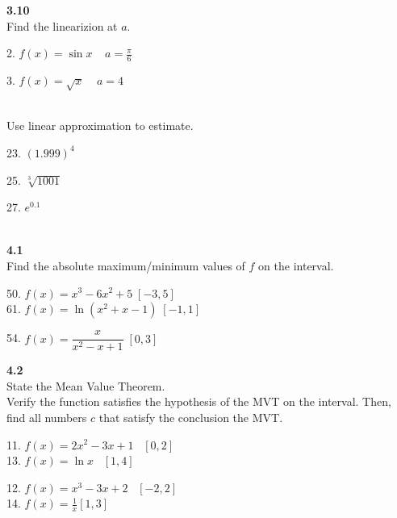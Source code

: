 \documentclass{letter}
\begin{document}
\begin{itemize}
		\textbf{3.10}\\
		
		Find the linearizion at $a$.\\
		\begin{minipage}[t]{0.5\textwidth}
			2. $f(x) = \sin x \;\;\;\; a = \frac{\pi}{6}$
		\end{minipage}
		\begin{minipage}[t]{0.5\textwidth}
			3. $f(x) = \sqrt x \;\;\;\; a = 4$
		\end{minipage}\\
		
		Use linear approximation to estimate.\\
		\begin{minipage}[t]{0.3\textwidth}
			23. $(1.999)^4$
		\end{minipage}
		\begin{minipage}[t]{0.3\textwidth}
			25. $\sqrt[3]{1001}$
		\end{minipage}
		\begin{minipage}[t]{0.3\textwidth}
			27. $e^{0.1}$\\
		\end{minipage}\\
		
		\textbf{4.1}\\
		
		Find the absolute maximum/minimum values of $f$ on the interval.\\
		\begin{minipage}[t]{0.5\textwidth}
			50. $f(x) = x^3 - 6x^2 + 5 \; \left[ -3, 5 \right]$\\
			61. $f(x) = \ln(x^2 + x - 1) \; \left[ -1, 1\right]$\\
		\end{minipage}
		\begin{minipage}[t]{0.5\textwidth}
			54. $f(x) = \dfrac{x}{x^2 - x + 1} \; \left[0, 3 \right]$
		\end{minipage}
		
		\textbf{4.2}\\
		
		State the Mean Value Theorem.\\
		
		Verify the function satisfies the hypothesis of the MVT on the interval. Then, find all numbers $c$ that satisfy the conclusion the MVT.\\
		
		\begin{minipage}[t]{0.5\textwidth}
			11. $f(x) = 2x^2 - 3x + 1 \;\;\; \left[0, 2\right]$\\
			13. $f(x) = \ln x \;\;\; \left[1, 4 \right]$
		\end{minipage}
		\begin{minipage}[t]{0.5\textwidth}
			12. $f(x) = x^3 - 3x + 2 \;\;\; \left[ -2, 2\right]$\\
			14. $f(x) = \frac{1}{x} \left[ 1, 3\right]$
		\end{minipage}
	\end{itemize}
\end{document}
